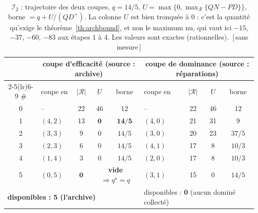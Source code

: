 \documentclass[11pt,a4paper]{article}
\theoremstyle{plain}
\theoremstyle{remark}
\newcommand{\Rcal}{\mathcal{R}}
\newcommand{\qs}{q^{\star}}
\newcommand{\confna}{\textsf{\footnotesize[\,sans mesure\,]}}
\begin{document}
\begin{table}[H]
\centering
\caption{$\mathcal{I}_2$ : trajectoire des deux coupes, $q=14/5$,
$U=\max\{0,\max_{\Rcal}\{QN-PD\}\}$, borne $=q+U/(QD^{+})$. La colonne $U$
est bien tronquée à $0$ : c'est la quantité qu'exige le
théorème~\ref{th:archbound}, et non le maximum nu, qui vaut ici
$-15$, $-37$, $-60$, $-83$ aux étapes $1$ à $4$. Les valeurs sont exactes
(rationnelles).\ \confna}
\label{tab:i2traj}
\setlength{\tabcolsep}{6pt}
\begin{tabular}{clccc@{\qquad}lccc}
\toprule
& \multicolumn{4}{c}{\textbf{coupe d'efficacité} (source : archive)}
& \multicolumn{4}{c}{coupe de dominance (source : réparations)}\\
\cmidrule(lr){2-5}\cmidrule(lr){6-9}
\# & coupe en & $|\Rcal|$ & $U$ & borne
   & coupe en & $|\Rcal|$ & $U$ & borne\\
\midrule
0 & --        & 22 & 46 & $12$
  & --        & 22 & 46 & $12$\\
1 & $(4,2)$   & 13 & $\mathbf{0}$ & $\mathbf{14/5}$
  & $(4,0)$   & 21 & 31 & $9$\\
2 & $(3,3)$   &  9 & 0 & $14/5$
  & $(3,0)$   & 20 & 23 & $37/5$\\
3 & $(2,3)$   &  6 & 0 & $14/5$
  & $(4,1)$   & 17 &  8 & $10/3$\\
4 & $(1,4)$   &  3 & 0 & $14/5$
  & $(2,0)$   & 17 &  8 & $10/3$\\
5 & $(0,5)$   & $\mathbf{0}$ & \multicolumn{2}{c}{\textbf{vide} $\Rightarrow \qs=q$}
  & $(3,1)$   & 15 & $0$ & $14/5$\\
\midrule
\multicolumn{5}{l}{\textbf{disponibles : 5 (l'archive)}}
& \multicolumn{4}{l}{disponibles : \textbf{0} (aucun dominé collecté)}\\
\bottomrule
\end{tabular}
\end{table}
\end{document}
